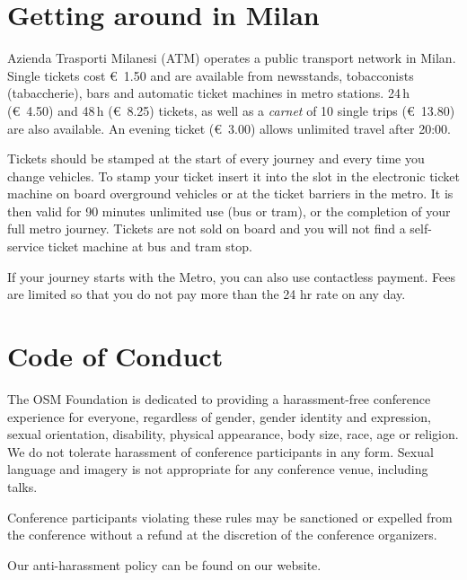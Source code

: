 \section*{Getting around in Milan}
\label{getting-around}
\pagestyle{cropmarksstyle}
Azienda Trasporti Milanesi (ATM) operates a public transport network in Milan. Single tickets cost
€~1.50 and are available from newsstands, tobacconists (tabaccherie), bars and automatic ticket
machines in metro stations. 24\,h (€~4.50) and 48\,h (€~8.25) tickets, as well as a \emph{carnet} of 10 single
trips (€~13.80) are also available. An evening ticket (€~3.00) allows unlimited travel after 20:00.

Tickets should be stamped at the start of every journey and every time you change vehicles. To stamp
your ticket insert it into the slot in the electronic ticket machine on board overground vehicles or
at the ticket barriers in the metro. It is then valid for 90 minutes unlimited use (bus or tram), or
the completion of your full metro journey. Tickets are not sold on board and you will not find a
self-service ticket machine at bus and tram stop.

If your journey starts with the Metro, you can also use contactless payment.
Fees are limited so that you do not pay more than the 24 hr rate on any day.

\section*{Code of Conduct}
\label{coc}
The OSM Foundation is dedicated to providing a harassment-free
conference experience for everyone, regardless of gender, gender identity
and expression, sexual orientation, disability, physical appearance, body
size, race, age or religion. We do not tolerate harassment of conference
participants in any form. Sexual language and imagery is not appropriate
for any conference venue, including talks.

Conference participants violating these rules may be sanctioned or
expelled from the conference without a refund at the discretion of the
conference organizers.

Our anti-harassment policy can be found on our website.
